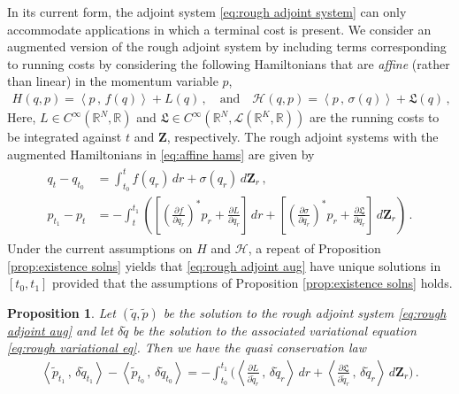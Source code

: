 \documentclass[11pt, oneside]{article}
\numberwithin{equation}{section}
\newtheorem{proposition}[lemma]{Proposition}
\theoremstyle{definition}
\newcommand{\wt}[1]{\widetilde{#1}}
\newcommand{\mc}[1]{\mathcal{#1}}
\newcommand{\mcal}[1]{\mc{#1}}
\newcommand{\scp}[2]{{\left\langle {#1}\, , \, {#2}\right\rangle}}
\def\p{{\partial}}
\def\p{\partial}
\begin{document}
In its current form, the adjoint system \eqref{eq:rough adjoint system} can only accommodate applications in which a terminal cost is present. We consider an augmented version of the rough adjoint system by including terms corresponding to running costs by considering the following Hamiltonians that are \emph{affine} (rather than linear) in the momentum variable $p$,
\begin{align}
    H(q, p) = \scp{p}{f(q)} + L(q)\,, \quad \text{and} \quad  \mcal{H}(q,p) = \scp{p}{\sigma(q)} + \mathfrak{L}(q)\,, \label{eq:affine hams}
\end{align}
Here, $L \in C^\infty(\mathbb{R}^N, \mathbb{R})$ and $\mathfrak{L} \in C^\infty(\mathbb{R}^N, \mcal{L}(\mathbb{R}^K, \mathbb{R}))$ are the running costs to be integrated against $t$ and $\mathbf{Z}$, respectively. 
The rough adjoint systems with the augmented Hamiltonians in \eqref{eq:affine hams} are given by
\begin{align}\label{eq:rough adjoint aug}
    \begin{split}
        q_t - q_{t_0} &= \int_{t_0}^t f(q_r)\,dr + \sigma(q_r)\, d\mathbf{Z}_r \,, \\
        p_{t_1} - p_t &= - \int_t^{t_1} \left(\left[\left(\frac{\p f}{\p q_r}\right)^*p_r + \frac{\p L}{\p q_r}\right]\,dr + \left[\left(\frac{\p \sigma}{\p q_r}\right)^* p_r + \frac{\p \mathfrak{L}}{\p q_r}\right]\, d\mathbf{Z}_r\right)\,.
    \end{split}
\end{align}
Under the current assumptions on $H$ and $\mcal{H}$, a repeat of Proposition \ref{prop:existence solns} yields that \eqref{eq:rough adjoint aug} have unique solutions in $[t_0, t_1]$ provided that the assumptions of Proposition \ref{prop:existence solns} holds. 
\begin{proposition}\label{prop:aug 1form conservation}
    Let $(\wt{q}, \wt{p})$ be the solution to the rough adjoint system \eqref{eq:rough adjoint aug} and let $\delta\wt{q}$ be the solution to the associated variational equation \eqref{eq:rough variational eq}. Then we have the quasi conservation law
    \begin{align}
        \scp{\wt{p}_{t_1}}{\delta \wt{q}_{t_1}} - \scp{\wt{p}_{t_0}}{\delta \wt{q}_{t_0}} = -\int_{t_0}^{t_1} \Bigg(\scp{\frac{\p L}{\p \wt{q}_r}}{\delta \wt{q}_r}\,dr + \scp{\frac{\p \mathfrak{L}}{\p \wt{q}_r}}{\delta \wt{q}_r}\,d\mathbf{Z}_r\Bigg)\,.\label{eq:quasi 1-form conservation}
    \end{align}
\end{proposition}
\end{document}

